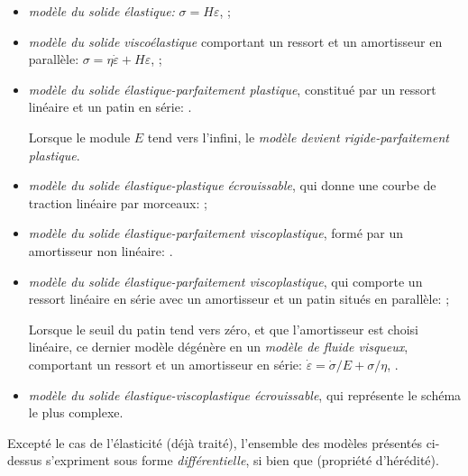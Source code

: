 \begin{itemize}
   \item \emph{modèle du solide élastique:} $\sigma = H \varepsilon$, ;
   \item \emph{modèle du solide viscoélastique} comportant un ressort et un amortisseur en parallèle:
	$\sigma=\eta\dot{\varepsilon}+H\varepsilon$, ;
   \item \emph{modèle du solide élastique-parfaitement plastique}, constitué par un ressort linéaire et 
	un patin en série: .

	Lorsque le module $E$ tend vers l'infini, le \emph{modèle devient rigide-parfaitement plastique}.
   \item \emph{modèle du solide élastique-plastique écrouissable}, qui donne une courbe de traction
	linéaire par morceaux: ;
   \item \emph{modèle du solide élastique-parfaitement viscoplastique}, formé par un amortisseur non linéaire: 
	.
\item \emph{modèle du solide élastique-parfaitement viscoplastique}, qui comporte un ressort linéaire en série 
	avec un amortisseur et un patin situés en parallèle: ;

	Lorsque le seuil du patin tend vers zéro, et que l'amortisseur est choisi linéaire, ce dernier modèle 
	dégénère en un \emph{modèle de fluide visqueux}, comportant un ressort et un amortisseur en série:
	$\dot{\varepsilon}=\dot{\sigma}/E+\sigma/\eta$, .
   \item \emph{modèle du solide élastique-viscoplastique écrouissable}, qui représente le schéma le plus complexe.
\end{itemize}

\medskip
Excepté le cas de l'élasticité (déjà traité), l'ensemble des modèles présentés ci-dessus s'expriment 
sous forme \emph{différentielle}, si bien que  (propriété d'hérédité). 

